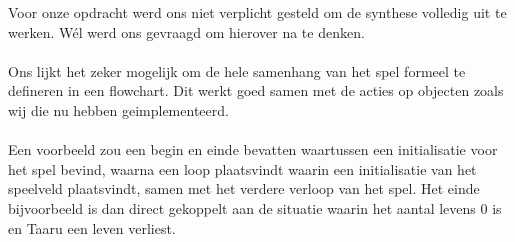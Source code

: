Voor onze opdracht werd ons niet verplicht gesteld om de synthese volledig uit te werken. W\'el werd ons gevraagd om hierover na te denken. \\
\\
Ons lijkt het zeker mogelijk om de hele samenhang van het spel formeel te defineren in een flowchart. Dit werkt goed samen met de acties op objecten zoals wij
die nu hebben geimplementeerd. \\
\\
Een voorbeeld zou een begin en einde bevatten waartussen een initialisatie voor het spel bevind, waarna een loop plaatsvindt waarin een initialisatie van
het speelveld plaatsvindt, samen met het verdere verloop van het spel. Het einde bijvoorbeeld is dan direct gekoppelt aan de situatie waarin het aantal levens 0
is en Taaru een leven verliest.

